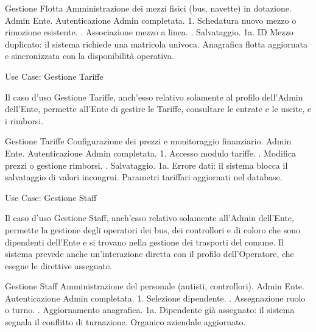 \vspace{0.5cm}

\usecasetable
{Gestione Flotta}
{Amministrazione dei mezzi fisici (bus, navette) in dotazione.}
{Admin Ente.}
{Autenticazione Admin completata.}
{1. Schedatura nuovo mezzo o rimozione esistente. . Associazione mezzo a linea. . Salvataggio.}
{1a. ID Mezzo duplicato: il sistema richiede una matricola univoca.}
{Anagrafica flotta aggiornata e sincronizzata con la disponibilità operativa.}
\newpage

\begin{center}
    {Use Case: Gestione Tariffe}
\end{center}
Il caso d'uso Gestione Tariffe, anch'esso relativo solamente al profilo dell'Admin dell'Ente, permette all'Ente di gestire le Tariffe, consultare le entrate e le uscite, e i rimborsi.

\vspace{0.5cm}

\usecasetable
{Gestione Tariffe}
{Configurazione dei prezzi e monitoraggio finanziario.}
{Admin Ente.}
{Autenticazione Admin completata.}
{1. Accesso modulo tariffe. . Modifica prezzi o gestione rimborsi. . Salvataggio.}
{1a. Errore dati: il sistema blocca il salvataggio di valori incongrui.}
{Parametri tariffari aggiornati nel database.}

\vspace{0.5cm}

\begin{center}
    {Use Case: Gestione Staff}
\end{center}
Il caso d'uso Gestione Staff, anch'esso relativo solamente all'Admin dell'Ente, permette la gestione degli operatori dei bus, dei controllori e di coloro che sono dipendenti dell'Ente e si trovano nella gestione dei trasporti del comune. Il sistema prevede anche un'interazione diretta con il profilo dell'Operatore, che esegue le direttive assegnate.

\vspace{0.5cm}

\usecasetable
{Gestione Staff}
{Amministrazione del personale (autisti, controllori).}
{Admin Ente.}
{Autenticazione Admin completata.}
{1. Selezione dipendente. . Assegnazione ruolo o turno. . Aggiornamento anagrafica.}
{1a. Dipendente già assegnato: il sistema segnala il conflitto di turnazione.}
{Organico aziendale aggiornato.}
\newpage

